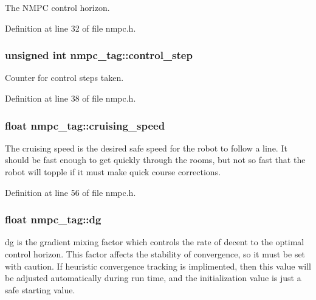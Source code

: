 The N\-M\-P\-C control horizon. 



Definition at line 32 of file nmpc.\-h.

\hypertarget{structnmpc__tag_ab3491736c176c8d799296d1ecc899443}{
\subsubsection[{control\-\_\-step}]{\setlength{\rightskip}{0pt plus 5cm}unsigned int nmpc\-\_\-tag\-::control\-\_\-step}}\label{structnmpc__tag_ab3491736c176c8d799296d1ecc899443}


Counter for control steps taken. 



Definition at line 38 of file nmpc.\-h.

\hypertarget{structnmpc__tag_a1ae55c15ff70d8c2abcb8170927224fa}{
\subsubsection[{cruising\-\_\-speed}]{\setlength{\rightskip}{0pt plus 5cm}float nmpc\-\_\-tag\-::cruising\-\_\-speed}}\label{structnmpc__tag_a1ae55c15ff70d8c2abcb8170927224fa}
The cruising speed is the desired safe speed for the robot to follow a line. It should be fast enough to get quickly through the rooms, but not so fast that the robot will topple if it must make quick course corrections. 

Definition at line 56 of file nmpc.\-h.

\hypertarget{structnmpc__tag_a93dbd0a5fccb5439e666738854a501ee}{
\subsubsection[{dg}]{\setlength{\rightskip}{0pt plus 5cm}float nmpc\-\_\-tag\-::dg}}\label{structnmpc__tag_a93dbd0a5fccb5439e666738854a501ee}
dg is the gradient mixing factor which controls the rate of decent to the optimal control horizon. This factor affects the stability of convergence, so it must be set with caution. If heuristic convergence tracking is implimented, then this value will be adjusted automatically during run time, and the initialization value is just a safe starting value. 

